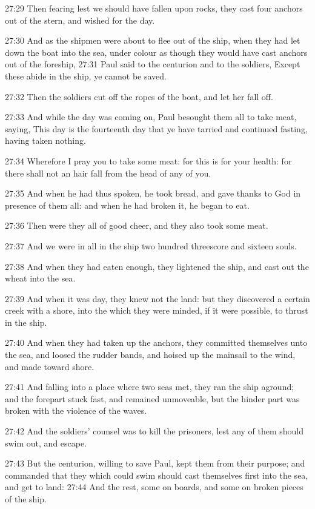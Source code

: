 27:29 Then fearing lest we should have fallen upon rocks, they cast four anchors out of the stern, and wished for the day.

27:30 And as the shipmen were about to flee out of the ship, when they had let down the boat into the sea, under colour as though they would have cast anchors out of the foreship, 27:31 Paul said to the centurion and to the soldiers, Except these abide in the ship, ye cannot be saved.

27:32 Then the soldiers cut off the ropes of the boat, and let her fall off.

27:33 And while the day was coming on, Paul besought them all to take meat, saying, This day is the fourteenth day that ye have tarried and continued fasting, having taken nothing.

27:34 Wherefore I pray you to take some meat: for this is for your health: for there shall not an hair fall from the head of any of you.

27:35 And when he had thus spoken, he took bread, and gave thanks to God in presence of them all: and when he had broken it, he began to eat.

27:36 Then were they all of good cheer, and they also took some meat.

27:37 And we were in all in the ship two hundred threescore and sixteen souls.

27:38 And when they had eaten enough, they lightened the ship, and cast out the wheat into the sea.

27:39 And when it was day, they knew not the land: but they discovered a certain creek with a shore, into the which they were minded, if it were possible, to thrust in the ship.

27:40 And when they had taken up the anchors, they committed themselves unto the sea, and loosed the rudder bands, and hoised up the mainsail to the wind, and made toward shore.

27:41 And falling into a place where two seas met, they ran the ship aground; and the forepart stuck fast, and remained unmoveable, but the hinder part was broken with the violence of the waves.

27:42 And the soldiers' counsel was to kill the prisoners, lest any of them should swim out, and escape.

27:43 But the centurion, willing to save Paul, kept them from their purpose; and commanded that they which could swim should cast themselves first into the sea, and get to land: 27:44 And the rest, some on boards, and some on broken pieces of the ship.

